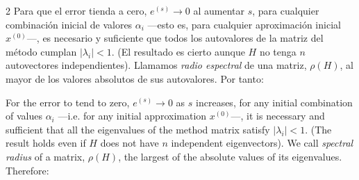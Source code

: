 \begin{paracol}{2}
Para que el error tienda a cero, $e^{(s)}\rightarrow 0$ al aumentar $s$, para cualquier combinación inicial de valores $\alpha_i$ ---esto es, para cualquier aproximación inicial $x^{(0)}$---, es necesario y suficiente que todos los autovalores de la matriz del método cumplan $\vert \lambda_i \vert < 1$. (El resultado es cierto aunque $H$ no tenga $n$ autovectores independientes). Llamamos \emph{radio espectral} de una matriz, $\rho(H)$, al mayor de los valores absolutos de sus autovalores. Por tanto:
\begin{center}
\end{center}

\switchcolumn
For the error to tend to zero, $e^{(s)}\rightarrow 0$ as $s$ increases, for any initial combination of values $\alpha_i$ ---i.e. for any initial approximation $x^{(0)}$---, it is necessary and sufficient that all the eigenvalues of the method matrix satisfy $\vert \lambda_i \vert < 1$. (The result holds even if $H$ does not have $n$ independent eigenvectors). We call \emph{spectral radius} of a matrix, $\rho(H)$, the largest of the absolute values of its eigenvalues. Therefore:
\begin{center}
\end{center}
\end{paracol}


